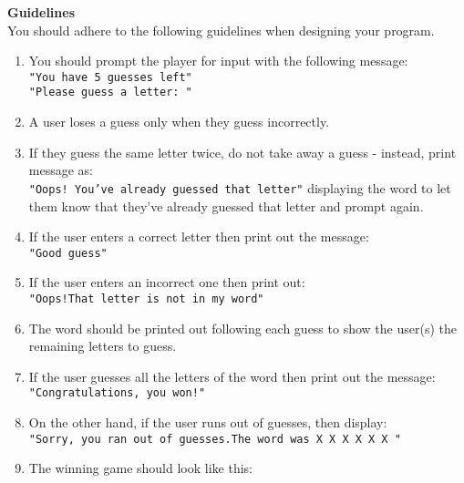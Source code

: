 \documentclass[12pt]{article}
\begin{document}
\vspace*{0.5cm}
\noindent\textbf{Guidelines}\\
You should adhere to the following guidelines when designing your program.
\begin{enumerate}
	\item You should prompt the player for input with the following message:\\
	\texttt{"You have 5 guesses left"}\\
	\texttt{"Please guess a letter: "}
	\item A user loses a guess only when they guess incorrectly.
	\item If they guess the same letter twice, do not take away a guess - instead, print message as:\\
	\texttt{"Oops! You've already guessed that letter"} displaying the word to let them know that they've already guessed that letter and prompt again.\\
	\item If the user enters a correct letter then print out the message:\\
	\texttt{"Good guess"}
	\item If the user enters an incorrect one then print out:\\
	\texttt{"Oops!That letter is not in my word"}
	\item The word should be printed out following each guess to show the user(s) the remaining letters to guess.
	\item If the user guesses all the letters of the word then print out the message:\\ 
	\texttt{"Congratulations, you won!"}
	\item On the other hand, if the user runs out of guesses, then display:\\ 
	\texttt{"Sorry, you ran out of guesses.The word was X X X X X X "}\\
	\item The winning game should look like this:
	

\end{enumerate}
\end{document}
